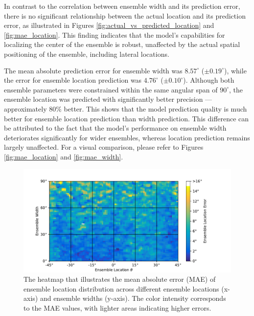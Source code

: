 \documentclass{article}
\begin{document}
In contrast to the correlation between ensemble width and its prediction error, there is no significant relationship between the actual location and its prediction error, as illustrated in Figures \ref{fig:actual_vs_predicted_location} and \ref{fig:mae_location}. This finding indicates that the model's capabilities for localizing the center of the ensemble is robust, unaffected by the actual spatial positioning of the ensemble, including lateral locations.

The mean absolute prediction error for ensemble width was $8.57^\circ$ ($\pm0.19^\circ$), while the error for ensemble location prediction was $4.76^\circ$ ($\pm0.10^\circ$). Although both ensemble parameters were constrained within the same angular span of $90^\circ$, the ensemble location was predicted with significantly better precision --- approximately $80\%$ better. This shows that the model prediction quality is much better for ensemble location prediction than width prediction. This difference can be attributed to the fact that the model's performance on ensemble width deteriorates significantly for wider ensembles, whereas location prediction remains largely unaffected. For a visual comparison, please refer to Figures \ref{fig:mae_location} and \ref{fig:mae_width}.

\begin{figure}[ht]
  \centering
  \includegraphics[width=\linewidth]{../figures/map_mae_location.pdf}
  \caption{\label{fig:map_mae_location}The heatmap that illustrates the mean absolute error (MAE) of ensemble location distribution across different ensemble locations (x-axis) and ensemble widths (y-axis). The color intensity corresponds to the MAE values, with lighter areas indicating higher errors.}
\end{figure}
\end{document}

